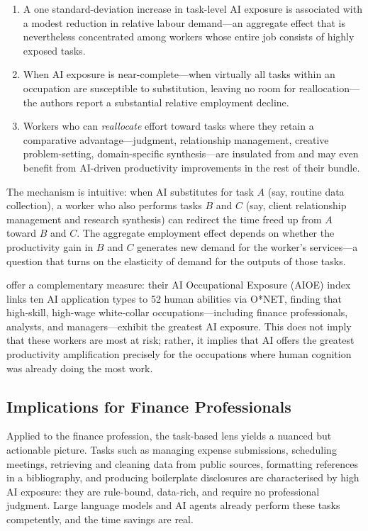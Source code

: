 \begin{context}
\begin{enumerate}
  \item A one standard-deviation increase in task-level AI exposure is associated with a
        modest reduction in relative labour demand---an aggregate effect
        that is nevertheless concentrated among workers whose entire job consists
        of highly exposed tasks.
  \item When AI exposure is near-complete---when virtually all tasks within an
        occupation are susceptible to substitution, leaving no room for
        reallocation---the authors report a substantial relative employment decline.
  \item Workers who can \emph{reallocate} effort toward tasks where they retain
        a comparative advantage---judgment, relationship management, creative
        problem-setting, domain-specific synthesis---are insulated from and may
        even benefit from AI-driven productivity improvements in the rest of their
        bundle.
\end{enumerate}

The mechanism is intuitive: when AI substitutes for task $A$ (say, routine
data collection), a worker who also performs tasks $B$ and $C$ (say, client
relationship management and research synthesis) can redirect the time freed up
from $A$ toward $B$ and $C$.  The aggregate employment effect depends on whether
the productivity gain in $B$ and $C$ generates new demand for the worker's
services---a question that turns on the elasticity of demand for the outputs
of those tasks.

\citet{felten2021occupational} offer a complementary measure: their AI
Occupational Exposure (AIOE) index links ten AI application types to 52 human
abilities via O*NET, finding that high-skill, high-wage white-collar
occupations---including finance professionals, analysts, and managers---exhibit
the greatest AI exposure.
This does not imply that these workers are most at risk; rather, it implies that
AI offers the greatest productivity amplification precisely for the occupations
where human cognition was already doing the most work.

\subsection{Implications for Finance Professionals}
\label{sec:tasks-finance}

Applied to the finance profession, the task-based lens yields a nuanced but
actionable picture.  Tasks such as managing expense submissions, scheduling
meetings, retrieving and cleaning data from public sources, formatting references
in a bibliography, and producing boilerplate disclosures are characterised by
high AI exposure: they are rule-bound, data-rich, and require no professional
judgment.  Large language models and AI agents already perform these tasks
competently, and the time savings are real.


\end{context}
